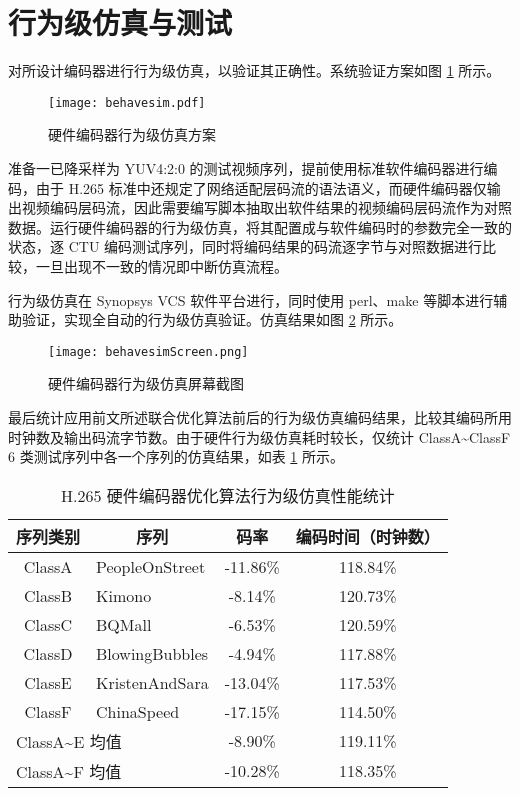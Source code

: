 \section{行为级仿真与测试}
对所设计编码器进行行为级仿真，以验证其正确性。系统验证方案如图 \ref{fig:behavesim} 所示。
\begin{figure}[hbt]
    \centering
    \texttt{[image: behavesim.pdf]}
    \caption{硬件编码器行为级仿真方案}
    \label{fig:behavesim}
\end{figure}
准备一已降采样为 YUV4:2:0 的测试视频序列，提前使用标准软件编码器进行编码，由于 H.265 标准中还规定了网络适配层码流的语法语义，而硬件编码器仅输出视频编码层码流，因此需要编写脚本抽取出软件结果的视频编码层码流作为对照数据。运行硬件编码器的行为级仿真，将其配置成与软件编码时的参数完全一致的状态，逐 CTU 编码测试序列，同时将编码结果的码流逐字节与对照数据进行比较，一旦出现不一致的情况即中断仿真流程。

行为级仿真在 Synopsys VCS 软件平台进行，同时使用 perl、make 等脚本进行辅助验证，实现全自动的行为级仿真验证。仿真结果如图 \ref{fig:behavesimScreen} 所示。
\begin{figure}[hbt]
    \centering
    \texttt{[image: behavesimScreen.png]}
    \caption{硬件编码器行为级仿真屏幕截图}
    \label{fig:behavesimScreen}
\end{figure}

最后统计应用前文所述联合优化算法前后的行为级仿真编码结果，比较其编码所用时钟数及输出码流字节数。由于硬件行为级仿真耗时较长，仅统计 ClassA\textasciitilde ClassF 6 类测试序列中各一个序列的仿真结果，如表 \ref{tab:behavesimTab} 所示。
\begin{table}[hbt]
    \centering
    \caption{H.265 硬件编码器优化算法行为级仿真性能统计}
    \label{tab:behavesimTab}
    \begin{tabular}{@{}clcc@{}}
        \toprule
        序列类别                           & \multicolumn{1}{c}{序列} & 码率     & 编码时间（时钟数） \\ \midrule
        ClassA                             & PeopleOnStreet           & -11.86\% & 118.84\%           \\
        ClassB                             & Kimono                   & -8.14\%  & 120.73\%           \\
        ClassC                             & BQMall                   & -6.53\%  & 120.59\%           \\
        ClassD                             & BlowingBubbles           & -4.94\%  & 117.88\%           \\
        ClassE                             & KristenAndSara           & -13.04\% & 117.53\%           \\
        ClassF                             & ChinaSpeed               & -17.15\% & 114.50\%           \\ \midrule
        \multicolumn{2}{l}{ClassA\textasciitilde E 均值} & -8.90\%                  & 119.11\%                      \\ \midrule
        \multicolumn{2}{l}{ClassA\textasciitilde F 均值} & -10.28\%                 & 118.35\%                      \\ \bottomrule
    \end{tabular}
\end{table}

